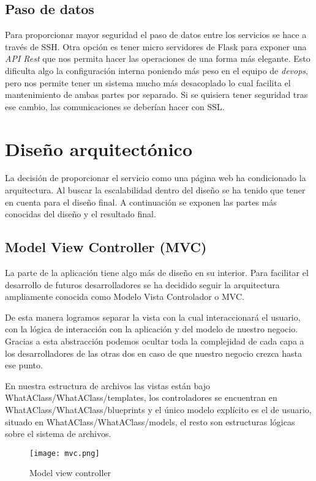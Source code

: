 \subsection{Paso de datos}

Para proporcionar mayor seguridad el paso de datos entre los servicios se hace a través de SSH. Otra opción es tener micro servidores de Flask para exponer una \emph{API Rest} que nos permita hacer las operaciones de una forma más elegante. Esto dificulta algo la configuración interna poniendo más peso en el equipo de \emph{devops}, pero nos permite tener un sistema mucho más desacoplado lo cual facilita el mantenimiento de ambas partes por separado. Si se quisiera tener seguridad tras ese cambio, las comunicaciones se deberían hacer con SSL. 


\section{Diseño arquitectónico}
La decisión de proporcionar el servicio como una página web ha condicionado la arquitectura. Al buscar la escalabilidad dentro del diseño se ha tenido que tener en cuenta para el diseño final. A continuación se exponen las partes más conocidas del diseño y el resultado final.

\subsection{Model View Controller (MVC)}

La parte de la aplicación tiene algo más de diseño en su interior. Para facilitar el desarrollo de futuros desarrolladores se ha decidido seguir la arquitectura ampliamente conocida como Modelo Vista Controlador o MVC. 

De esta manera logramos separar la vista con la cual interaccionará el usuario, con la lógica de interacción con la aplicación y del modelo de nuestro negocio. Gracias a esta abstracción podemos ocultar toda la complejidad de cada capa a los desarrolladores de las otras dos en caso de que nuestro negocio crezca hasta ese punto.

En nuestra estructura de archivos las vistas están bajo WhatAClass/WhatAClass/templates, los controladores se encuentran en WhatAClass/WhatAClass/blueprints y el único modelo explícito es el de usuario, situado en WhatAClass/WhatAClass/models, el resto son estructuras lógicas sobre el sistema de archivos.


\begin{figure}
	\centering
	\texttt{[image: mvc.png]}
	\caption{Model view controller}\label{fig:mvc.png}
\end{figure}



